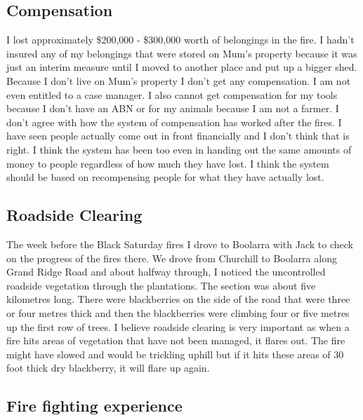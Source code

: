 \documentclass[a4paper]{article}
\begin{document}
    \subsection{Compensation}

        I lost approximately \$200,000 - \$300,000 worth of belongings in the fire. I hadn't insured any of my belongings that were stored on Mum's property because it was just an interim measure until I moved to another place and put up a bigger shed. Because I don't live on Mum's property I don't get any compensation. I am not even entitled to a case manager. I also cannot get compensation for my tools because I don't have an ABN or for my animals because I am not a farmer.
        I don't agree with how the system of compensation has worked after the fires. I have seen people actually come out in front financially and I don't think that is right. I think the system has been too even in handing out the same amounts of money to people regardless of how much they have lost. I think the system should be based on recompensing people for what they have actually lost.

    \subsection{Roadside Clearing}

        The week before the Black Saturday fires I drove to Boolarra with Jack to check on the progress of the fires there. We drove from Churchill to Boolarra along Grand Ridge Road and about halfway through, I noticed the uncontrolled roadside vegetation through the plantations. The section was about five kilometres long. There were blackberries on the side of the road that were three or four metres thick and then the blackberries were climbing four or five metres up the first row of trees.
        I believe roadside clearing is very important as when a fire hits areas of vegetation that have not been managed, it flares out. The fire might have slowed and would be trickling uphill but if it hits these areas of 30 foot thick dry blackberry, it will flare up again.

    \subsection{Fire fighting experience}
\end{document}

